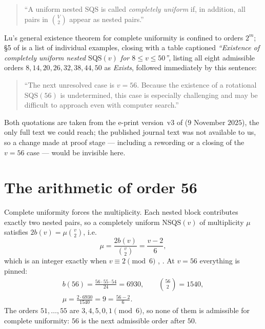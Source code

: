 \documentclass[11pt]{amsart}
\newcommand{\SQS}{\mathrm{SQS}}
\newcommand{\NSQS}{\mathrm{NSQS}}
\begin{document}
\begin{quote}
``A uniform nested $\SQS$ is called \emph{completely uniform} if, in addition,
all pairs in $\binom{V}{2}$ appear as nested pairs.''
\end{quote}

Lu's general existence theorem for complete uniformity is confined to orders
$2^m$; \S5 of \cite{Lu} is a list of individual examples, closing with a table
captioned \emph{``Existence of
completely uniform nested $\SQS(v)$ for $8\le v\le 50$''}, listing all eight
admissible orders $8,14,20,26,32,38,44,50$ as \emph{Exists}, followed
immediately by this sentence:

\begin{quote}
``The next unresolved case is $v=56$. Because the existence of a rotational
$\SQS(56)$ is undetermined, this case is especially challenging and may be
difficult to approach even with computer search.''
\end{quote}

Both quotations are taken from the e-print version~v3 of \cite{Lu} ($9$
November $2025$), the only full text we could reach; the published journal text
was not available to us, so a change made at proof stage --- including a
rewording or a closing of the $v=56$ case --- would be invisible here.

\section{The arithmetic of order 56}

Complete uniformity forces the multiplicity. Each nested block contributes
exactly two nested pairs, so a completely uniform $\NSQS(v)$ of multiplicity
$\mu$ satisfies $2b(v)=\mu\binom{v}{2}$, i.e.
\begin{equation}\label{eq:mu}
 \mu=\frac{2b(v)}{\binom{v}{2}}=\frac{v-2}{6},
\end{equation}
which is an integer exactly when $v\equiv2\pmod 6$ \cite[\S2]{Lu},
\cite[\S4]{CDEKZ}. At $v=56$ everything is pinned:
\begin{equation}\label{eq:56}
\begin{gathered}
 b(56)=\frac{56\cdot55\cdot54}{24}=6930,\qquad
 \binom{56}{2}=1540,\\
 \mu=\frac{2\cdot6930}{1540}=9=\frac{56-2}{6}.
\end{gathered}
\end{equation}
The orders $51,\ldots,55$ are $3,4,5,0,1\pmod 6$, so none of them is admissible
for complete uniformity: $56$ is the next admissible order after $50$.
\end{document}
